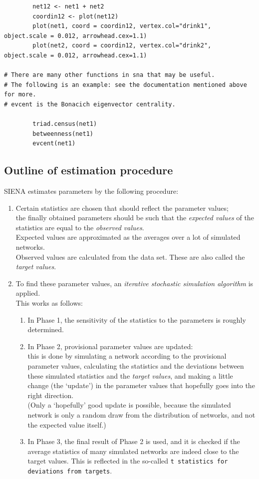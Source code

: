 \documentclass[a4paper,fleqn]{article}
\newcommand{\+}{\, + \,}
\newcommand{\SI}{{\sf SIENA }}
\begin{document}
{\begin{verbatim}
        net12 <- net1 + net2
        coordin12 <- plot(net12)
        plot(net1, coord = coordin12, vertex.col="drink1", object.scale = 0.012, arrowhead.cex=1.1)
        plot(net2, coord = coordin12, vertex.col="drink2", object.scale = 0.012, arrowhead.cex=1.1)

# There are many other functions in sna that may be useful.
# The following is an example: see the documentation mentioned above for more.
# evcent is the Bonacich eigenvector centrality.

        triad.census(net1)
        betweenness(net1)
        evcent(net1)
\end{verbatim}

\subsection{Outline of estimation procedure}
\noindent
\SI estimates parameters by the following procedure:
\begin{enumerate}
\item  Certain statistics are chosen that should reflect the parameter values;\\
  the finally obtained parameters should be such that the \emph{expected
    values}
  of the statistics are equal to the \emph{observed values}.\\
  Expected values are approximated as the averages over a lot of simulated
  networks.\\
  Observed values are calculated from the data set. These are also called the
  \emph{target values}.
\item To find these parameter values, an \emph{iterative stochastic simulation
    algorithm}
  is applied.\\
  This works as follows:
\begin{enumerate}
\item In Phase 1, the sensitivity of the statistics to the parameters is roughly
  determined.
\item In Phase 2, provisional parameter values are updated:\\
  this is done by simulating a network according to the provisional parameter
  values, calculating the statistics and the deviations between these simulated
  statistics and the \emph{target values}, and making a little change (the
  `update') in the parameter values
  that hopefully goes into the right direction.\\
  (Only a `hopefully' good update is possible, because the simulated network is
  only a random draw from the distribution of networks, and not the expected
  value itself.)
\item In Phase 3, the final result of Phase 2 is used, and it is checked if the
  average statistics of many simulated networks are indeed close to the target
  values. This is reflected in the so-called \texttt{t statistics for deviations
    from targets}.
\end{enumerate}
\end{enumerate}

}
\end{document}
